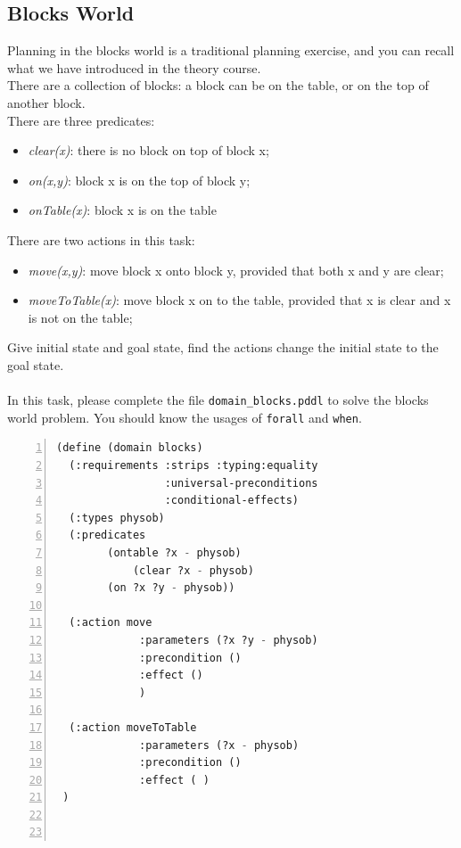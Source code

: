 ﻿\documentclass[a4paper, 11pt]{article}
\begin{document}
\subsection{Blocks World}
Planning in the blocks world is a traditional planning exercise, and you can recall what we have introduced in the theory course.
\\ There are a collection of blocks: a block can be on the table, or on the top of another block. 
\\ There are three predicates:  
\begin{itemize}

\item\textit{clear(x)}: there is no block on top of block x;

\item \textit {on(x,y)}: block x is on the top of block y;

\item   \textit {onTable(x)}: block x is on the table

\end{itemize}There are two actions in this task:
\begin{itemize}

\item\textit{move(x,y)}: move block x onto block y, provided that both x and y are clear;

\item \textit {moveToTable(x)}: move block x on to the table, provided that x is clear and x is not on the table;

\end{itemize}Give initial state and goal state, find the actions change the initial state to the goal state.
\\
\\
In this task, please complete the file \texttt{domain\_blocks.pddl} to solve the blocks world problem. You should know the usages of \texttt{forall} and \texttt{when}.

\begin{lstlisting}[title=domain\_blocks.pddl,frame=single,language=lisp,numbers=left]
(define (domain blocks)
  (:requirements :strips :typing:equality
                 :universal-preconditions
                 :conditional-effects)
  (:types physob)
  (:predicates   
  	    (ontable ?x - physob)
            (clear ?x - physob)	
	    (on ?x ?y - physob))
		
  (:action move
             :parameters (?x ?y - physob)
             :precondition ()
             :effect ()
             )

  (:action moveToTable
             :parameters (?x - physob)
             :precondition ()
             :effect ( )
 )



\end{lstlisting}
\end{document}
